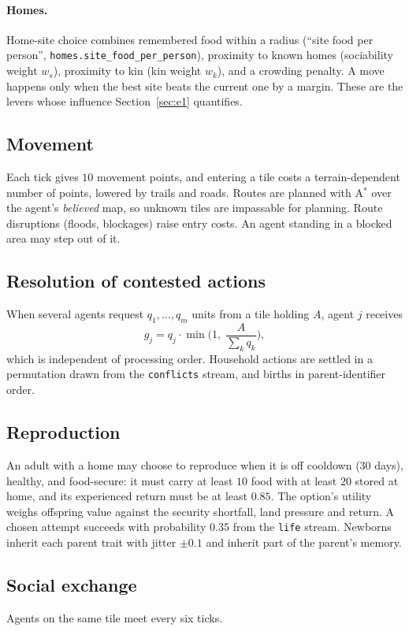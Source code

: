 \documentclass[11pt]{article}
\theoremstyle{definition}
\newcommand{\1}{\mathbf{1}}
\newcommand{\cfg}[1]{\texttt{\small #1}}
\begin{document}
\paragraph{Homes.} Home-site choice combines remembered food within a radius (``site food per person'', \cfg{homes.site\_food\_per\_person}), proximity to known homes (sociability weight $w_s$), proximity to kin (kin weight $w_k$), and a crowding penalty. A move happens only when the best site beats the current one by a margin. These are the levers whose influence Section~\ref{sec:e1} quantifies.

\subsection{Movement}
Each tick gives $10$ movement points, and entering a tile costs a terrain-dependent number of points, lowered by trails and roads. Routes are planned with A$^\ast$ over the agent's \emph{believed} map, so unknown tiles are impassable for planning. Route disruptions (floods, blockages) raise entry costs. An agent standing in a blocked area may step out of it.

\subsection{Resolution of contested actions}
When several agents request $q_1,\dots,q_m$ units from a tile holding $A$, agent $j$ receives
\begin{equation}
g_j = q_j\cdot\min\!\Big(1,\; \frac{A}{\sum_k q_k}\Big),
\end{equation}
which is independent of processing order. Household actions are settled in a permutation drawn from the \cfg{conflicts} stream, and births in parent-identifier order.

\subsection{Reproduction}
An adult with a home may choose to reproduce when it is off cooldown (30 days), healthy, and food-secure: it must carry at least $10$ food with at least $20$ stored at home, and its experienced return must be at least $0.85$. The option's utility weighs offspring value against the security shortfall, land pressure and return. A chosen attempt succeeds with probability $0.35$ from the \cfg{life} stream. Newborns inherit each parent trait with jitter $\pm0.1$ and inherit part of the parent's memory.

\subsection{Social exchange}
Agents on the same tile meet every six ticks.
\end{document}
